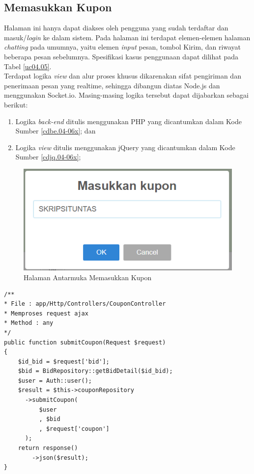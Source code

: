 \subsection{Memasukkan Kupon}
Halaman ini hanya dapat diakses oleh pengguna yang sudah terdaftar dan masuk/\textit{login} ke dalam sistem. Pada halaman ini terdapat elemen-elemen halaman \textit{chatting} pada umumnya, yaitu elemen \textit{input} pesan, tombol Kirim, dan riwayat beberapa pesan sebelumnya. Spesifikasi kasus penggunaan dapat dilihat pada Tabel \ref{uc04.05}.\\
\indent Terdapat logika \textit{view} dan alur proses khusus dikarenakan sifat pengiriman dan penerimaan pesan yang realtime, sehingga dibangun diatas Node.js dan menggunakan Socket.io. Masing-masing logika tersebut dapat dijabarkan sebagai berikut:
\begin{enumerate}
	\item Logika \textit{back-end} ditulis menggunakan PHP yang dicantumkan dalam Kode Sumber \ref{cdbe.04-06x}; dan
	\item Logika \textit{view} ditulis menggunakan jQuery yang dicantumkan dalam Kode Sumber \ref{cdjq.04-06x};
\end{enumerate}

\begin{figure}[h]
	\centering
	\includegraphics[width=.9\textwidth]{images/bab4/ui/04-06.png}
	\caption{Halaman Antarmuka Memasukkan Kupon}
	\label{ui.04-06x}
\end{figure}

\newpage

\begin{lstlisting}[label=cdbe.04-06x,style=php,caption=Implementasi \textit{Back-end} Memasukkan Kupon]
/** 
* File : app/Http/Controllers/CouponController
* Memproses request ajax
* Method : any
*/
public function submitCoupon(Request $request)
{
	$id_bid = $request['bid'];
	$bid = BidRepository::getBidDetail($id_bid);
	$user = Auth::user();
	$result = $this->couponRepository
	  ->submitCoupon(
	      $user
	      , $bid
	      , $request['coupon']
	  );
	return response()
	    ->json($result);
}

\end{lstlisting}

